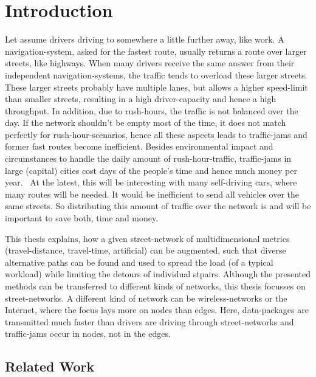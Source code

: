 \chapter{Introduction}
\label{chap:introduction}


Let assume drivers driving to somewhere a little further away, like work.
A navigation-system, asked for the fastest route, usually returns a route over larger streets, like highways.
When many drivers receive the same answer from their independent navigation-systems, the traffic tends to overload these larger streets.
These larger streets probably have multiple lanes, but allows a higher speed-limit than smaller streets, resulting in a high driver-capacity and hence a high throughput.
In addition, due to rush-hours, the traffic is not balanced over the day.
If the network shouldn't be empty most of the time, it does not match perfectly for rush-hour-scenarios, hence all these aspects leads to traffic-jams and former fast routes become inefficient.
Besides environmental impact and circumstances to handle the daily amount of rush-hour-traffic, traffic-jams in large (capital) cities cost days of the people's time and hence much money per year.~\cite{inrix:traffic-cost}
At the latest, this will be interesting with many self-driving cars, where many routes will be needed.
It would be inefficient to send all vehicles over the same streets.
So distributing this amount of traffic over the network is and will be important to save both, time and money.

This thesis explains, how a given street-network of multidimensional \glspl{metric} (travel-distance, travel-time, artificial) can be augmented, such that diverse alternative paths can be found and used to spread the load (of a typical workload) while limiting the detours of individual \glspl{stpair}.
Although the presented methods can be transferred to different kinds of networks, this thesis focusses on street-networks.
A different kind of network can be wireless-networks or the Internet, where the focus lays more on nodes than edges.
Here, data-packages are transmitted much faster than drivers are driving through street-networks and traffic-jams occur in nodes, not in the edges.

\section{Related Work}

